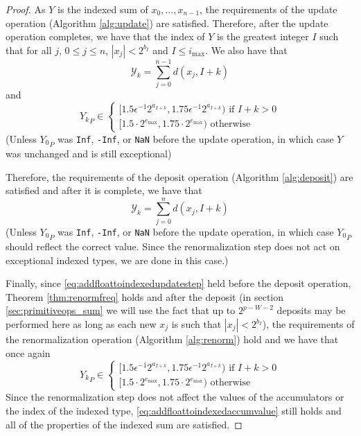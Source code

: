   \begin{proof}
    As $Y$ is the indexed sum of $x_0, ..., x_{n - 1}$, the requirements of the update operation (Algorithm \ref{alg:update}) are satisfied. Therefore, after the update operation completes, we have that the index of $Y$ is the greatest integer $I$ such that for all $j$, $0 \leq j \leq n$, $|x_j| < 2^{b_I}$ and $I \leq i_{\max}$. We also have that 
\[
\mathcal{Y}_k = \sum\limits_{j = 0}^{n - 1} d(x_j, I + k)
\]
  and
  \begin{equation}
          {Y_k}_P \in \begin{cases}[1.5  \epsilon^{-1} 2^{a_{I + k}}, 1.75  \epsilon^{-1} 2^{a_{I + k}}) \text{ if } I + k > 0 \\ [1.5 \cdot 2^{e_{\max}}, 1.75 \cdot 2^{e_{\max}})\text{ otherwise}\end{cases} \label{eq:addfloattoindexedupdatestep}
  \end{equation}
  (Unless ${Y_0}_P$ was \texttt{Inf}, \texttt{-Inf}, or \texttt{NaN} before the update operation, in which case $Y$ was unchanged and is still exceptional)

  Therefore, the requirements of the deposit operation (Algorithm \ref{alg:deposit}) are satisfied and after it is complete, we have that
  \begin{equation}
    \mathcal{Y}_k = \sum\limits_{j = 0}^{n} d(x_j, I + k)
    \label{eq:addfloattoindexedaccumvalue}
  \end{equation}
  (Unless ${Y_0}_P$ was \texttt{Inf}, \texttt{-Inf}, or \texttt{NaN} before the update operation, in which case ${Y_0}_P$ should reflect the correct value. Since the renormalization step does not act on exceptional indexed types, we are done in this case.)

  Finally, since \eqref{eq:addfloattoindexedupdatestep} held before the deposit operation, Theorem \ref{thm:renormfreq} holds and after the deposit (in section \ref{sec:primitiveops_sum} we will use the fact that up to $2^{p - W - 2}$ deposits may be performed here as long as each new $x_j$ is such that $|x_j| < 2^{b_I}$), the requirements of the renormalization operation (Algorithm \ref{alg:renorm}) hold and we have that once again
  \[
  {Y_k}_P \in \begin{cases}[1.5  \epsilon^{-1} 2^{a_{I + k}}, 1.75  \epsilon^{-1} 2^{a_{I + k}}) \text{ if } I + k > 0 \\ [1.5 \cdot 2^{e_{\max}}, 1.75 \cdot 2^{e_{\max}})\text{ otherwise}\end{cases}
  \]
  Since the renormalization step does not affect the values of the accumulators or the index of the indexed type, \eqref{eq:addfloattoindexedaccumvalue} still holds and all of the properties of the indexed sum are satisfied.
  \end{proof}

